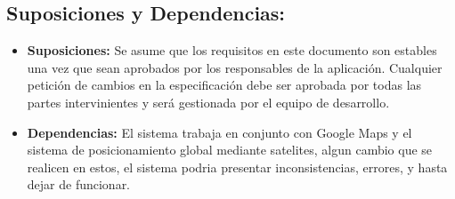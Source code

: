     \subsection{Suposiciones y Dependencias:}
      \begin{itemize}
        \item \textbf{Suposiciones:} Se asume que los requisitos en este documento son estables una vez que sean aprobados por los responsables de la aplicación. Cualquier petición de cambios en la especificación debe ser aprobada por todas las partes intervinientes y será gestionada por el equipo de desarrollo.
        \item \textbf{Dependencias:} El sistema trabaja en conjunto con Google Maps y el sistema de posicionamiento global mediante satelites, algun cambio que se realicen en estos, el sistema podria presentar inconsistencias, errores, y hasta dejar de funcionar.
      \end{itemize}

